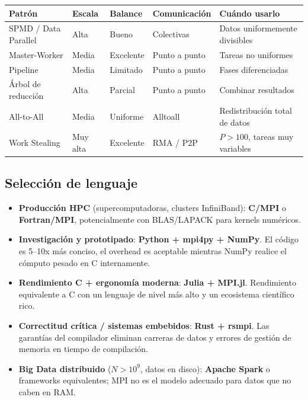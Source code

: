 \documentclass[12pt,a4paper]{article}
\begin{document}
\begin{longtable}{L{3.5cm} L{2cm} L{2cm} L{2.5cm} L{3.5cm}}
\toprule
\textbf{Patrón} & \textbf{Escala} & \textbf{Balance} & \textbf{Comunicación} & \textbf{Cuándo usarlo} \\
\midrule
\endhead
SPMD / Data Parallel & Alta & Bueno & Colectivas & Datos uniformemente divisibles \\
Master-Worker & Media & Excelente & Punto a punto & Tareas no uniformes \\
Pipeline & Media & Limitado & Punto a punto & Fases diferenciadas \\
Árbol de reducción & Alta & Parcial & Punto a punto & Combinar resultados \\
All-to-All & Media & Uniforme & Alltoall & Redistribución total de datos \\
Work Stealing & Muy alta & Excelente & RMA / P2P & $P > 100$, tareas muy variables \\
\bottomrule
\end{longtable}

\subsection*{Selección de lenguaje}

\begin{itemize}
  \item \textbf{Producción HPC} (supercomputadoras, clusters InfiniBand): \textbf{C/MPI} o
    \textbf{Fortran/MPI}, potencialmente con BLAS/LAPACK para kernels numéricos.
  \item \textbf{Investigación y prototipado}: \textbf{Python + mpi4py + NumPy}. El código
    es 5--10x más conciso, el overhead es aceptable mientras NumPy realice el
    cómputo pesado en C internamente.
  \item \textbf{Rendimiento C + ergonomía moderna}: \textbf{Julia + MPI.jl}. Rendimiento
    equivalente a C con un lenguaje de nivel más alto y un ecosistema científico rico.
  \item \textbf{Correctitud crítica / sistemas embebidos}: \textbf{Rust + rsmpi}.
    Las garantías del compilador eliminan carreras de datos y errores de gestión
    de memoria en tiempo de compilación.
  \item \textbf{Big Data distribuido} ($N > 10^9$, datos en disco): \textbf{Apache Spark}
    o frameworks equivalentes; MPI no es el modelo adecuado para datos que no
    caben en RAM.
\end{itemize}
\end{document}
